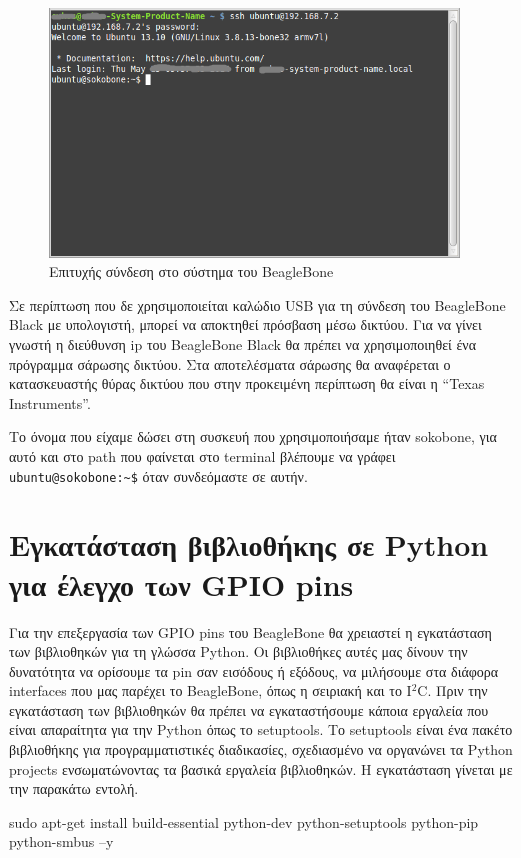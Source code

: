 \documentclass[12pt, a4paper, oneside]{report}
\begin{document}
\begin{figure}[t]
\centering
\includegraphics[width=0.97\textwidth]{eikona_27}
\caption{Επιτυχής σύνδεση στο σύστημα του BeagleBone}\label{eik27}
\end{figure}

Σε περίπτωση που δε χρησιμοποιείται καλώδιο USB για τη σύνδεση του BeagleBone Black με υπολογιστή, μπορεί να αποκτηθεί πρόσβαση μέσω δικτύου. Για να γίνει γνωστή η διεύθυνση ip του BeagleBone Black θα πρέπει να χρησιμοποιηθεί ένα πρόγραμμα σάρωσης δικτύου. Στα αποτελέσματα σάρωσης θα αναφέρεται ο κατασκευαστής θύρας δικτύου που στην προκειμένη περίπτωση θα είναι η ``Texas Instruments''.

Το όνομα που είχαμε δώσει στη συσκευή που χρησιμοποιήσαμε ήταν sokobone, για αυτό και στο path που φαίνεται στο terminal βλέπουμε να γράφει \verb+ubuntu@sokobone:~$+ όταν συνδεόμαστε σε αυτήν.

\section[Βιβλιοθήκη για έλεγχο GPIOs]{Εγκατάσταση βιβλιοθήκης σε Python για έλεγχο των GPIO pins}

Για την επεξεργασία των GPIO pins του BeagleBone θα χρειαστεί η εγκατάσταση των βιβλιοθηκών για τη γλώσσα Python. Οι βιβλιοθήκες αυτές μας δίνουν την δυνατότητα να ορίσουμε τα pin σαν εισόδους ή εξόδους, να μιλήσουμε στα διάφορα interfaces που μας παρέχει το BeagleBone, όπως η σειριακή και το I$^2$C. Πριν την εγκατάσταση των βιβλιοθηκών θα πρέπει να εγκαταστήσουμε κάποια εργαλεία που είναι απαραίτητα για την Python όπως το setuptools. Το setuptools είναι ένα πακέτο βιβλιοθήκης για προγραμματιστικές διαδικασίες, σχεδιασμένο να οργανώνει τα Python projects ενσωματώνοντας τα βασικά εργαλεία βιβλιοθηκών. Η εγκατάσταση γίνεται με την παρακάτω εντολή.
\begin{code}
sudo apt-get install build-essential python-dev python-setuptools python-pip python-smbus –y
\end{code}
\end{document}
